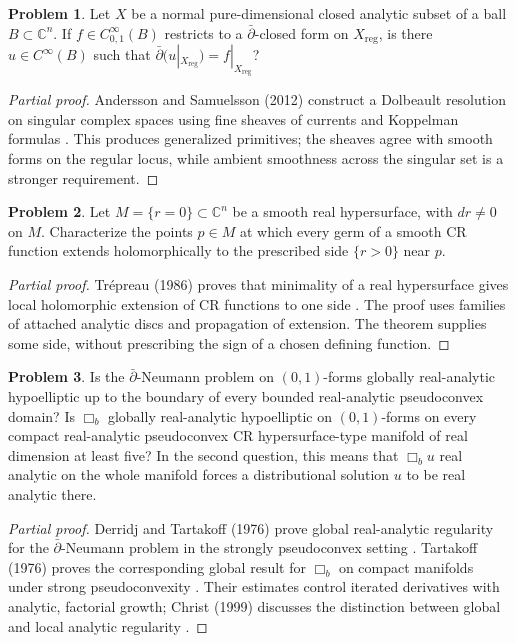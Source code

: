 \documentclass[11pt,reqno]{amsart}
\theoremstyle{definition}
\newtheorem{problem}{Problem}[section]
\theoremstyle{remark}
\begin{document}
\begin{problem}\label{FS-3.1}
Let $X$ be a normal pure-dimensional closed analytic subset of a ball $B\subset\mathbb C^n$. If $f\in C^\infty_{0,1}(B)$ restricts to a $\bar\partial$-closed form on $X_{\mathrm{reg}}$, is there $u\in C^\infty(B)$ such that $\bar\partial(u|_{X_{\mathrm{reg}}})=f|_{X_{\mathrm{reg}}}$?
\end{problem}
\begin{proof}[Partial proof]
Andersson and Samuelsson (2012) construct a Dolbeault resolution on singular complex spaces using fine sheaves of currents and Koppelman formulas \cite{FS-AS}. This produces generalized primitives; the sheaves agree with smooth forms on the regular locus, while ambient smoothness across the singular set is a stronger requirement.
\end{proof}

\begin{problem}\label{b95-3-1-1}
Let $M=\{r=0\}\subset\mathbb C^n$ be a smooth real hypersurface, with $dr\ne0$ on $M$. Characterize the points $p\in M$ at which every germ of a smooth CR function extends holomorphically to the prescribed side $\{r>0\}$ near $p$.
\end{problem}
\begin{proof}[Partial proof]
Tr\'epreau (1986) proves that minimality of a real hypersurface gives local holomorphic extension of CR functions to one side \cite{B95-Trepreau}. The proof uses families of attached analytic discs and propagation of extension. The theorem supplies some side, without prescribing the sign of a chosen defining function.
\end{proof}

\begin{problem}\label{b95-6-1-4}
Is the $\bar\partial$-Neumann problem on $(0,1)$-forms globally real-analytic hypoelliptic up to the boundary of every bounded real-analytic pseudoconvex domain? Is $\Box_b$ globally real-analytic hypoelliptic on $(0,1)$-forms on every compact real-analytic pseudoconvex CR hypersurface-type manifold of real dimension at least five? In the second question, this means that $\Box_bu$ real analytic on the whole manifold forces a distributional solution $u$ to be real analytic there.
\end{problem}
\begin{proof}[Partial proof]
Derridj and Tartakoff (1976) prove global real-analytic regularity for the $\bar\partial$-Neumann problem in the strongly pseudoconvex setting \cite{AN-DT76}. Tartakoff (1976) proves the corresponding global result for $\Box_b$ on compact manifolds under strong pseudoconvexity \cite{AN-Tartakoff76}. Their estimates control iterated derivatives with analytic, factorial growth; Christ (1999) discusses the distinction between global and local analytic regularity \cite{B95-ChristSurvey}.
\end{proof}
\end{document}
